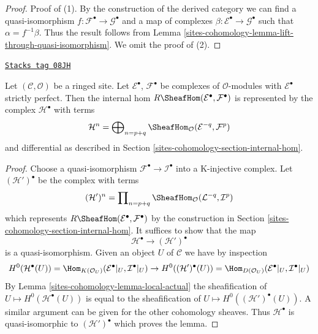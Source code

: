 \begin{proof}
Proof of (1).
By the construction of the derived category we can find a quasi-isomorphism
$f : \mathcal{F}^\bullet \to \mathcal{G}^\bullet$ and a map of complexes
$\beta : \mathcal{E}^\bullet \to \mathcal{G}^\bullet$ such that
$\alpha = f^{-1}\beta$. Thus the result follows from
Lemma \ref{sites-cohomology-lemma-lift-through-quasi-isomorphism}.
We omit the proof of (2).
\end{proof}

\begin{lemma}
\label{sites-cohomology-lemma-Rhom-strictly-perfect}
\href{https://stacks.math.columbia.edu/tag/08JH}{\texttt{Stacks tag 08JH}}

Let $(\mathcal{C}, \mathcal{O})$ be a ringed site.
Let $\mathcal{E}^\bullet$, $\mathcal{F}^\bullet$ be complexes
of $\mathcal{O}$-modules with $\mathcal{E}^\bullet$ strictly perfect.
Then the internal hom $R\SheafHom(\mathcal{E}^\bullet, \mathcal{F}^\bullet)$
is represented by the complex $\mathcal{H}^\bullet$ with terms
$$
\mathcal{H}^n =
\bigoplus\nolimits_{n = p + q}
\SheafHom_\mathcal{O}(\mathcal{E}^{-q}, \mathcal{F}^p)
$$
and differential as described in Section \ref{sites-cohomology-section-internal-hom}.
\end{lemma}

\begin{proof}
Choose a quasi-isomorphism $\mathcal{F}^\bullet \to \mathcal{I}^\bullet$
into a K-injective complex. Let $(\mathcal{H}')^\bullet$ be the
complex with terms
$$
(\mathcal{H}')^n =
\prod\nolimits_{n = p + q}
\SheafHom_\mathcal{O}(\mathcal{L}^{-q}, \mathcal{I}^p)
$$
which represents $R\SheafHom(\mathcal{E}^\bullet, \mathcal{F}^\bullet)$
by the construction in Section \ref{sites-cohomology-section-internal-hom}. It suffices
to show that the map
$$
\mathcal{H}^\bullet \longrightarrow (\mathcal{H}')^\bullet
$$
is a quasi-isomorphism. Given an object $U$ of $\mathcal{C}$ we have
by inspection
$$
H^0(\mathcal{H}^\bullet(U)) =
\Hom_{K(\mathcal{O}_U)}(\mathcal{E}^\bullet|_U, \mathcal{I}^\bullet|_U)
\to
H^0((\mathcal{H}')^\bullet(U)) =
\Hom_{D(\mathcal{O}_U)}(\mathcal{E}^\bullet|_U, \mathcal{I}^\bullet|_U)
$$
By Lemma \ref{sites-cohomology-lemma-local-actual} the sheafification of
$U \mapsto H^0(\mathcal{H}^\bullet(U))$
is equal to the sheafification of
$U \mapsto H^0((\mathcal{H}')^\bullet(U))$. A similar argument can be
given for the other cohomology sheaves. Thus $\mathcal{H}^\bullet$
is quasi-isomorphic to $(\mathcal{H}')^\bullet$ which proves the lemma.
\end{proof}

